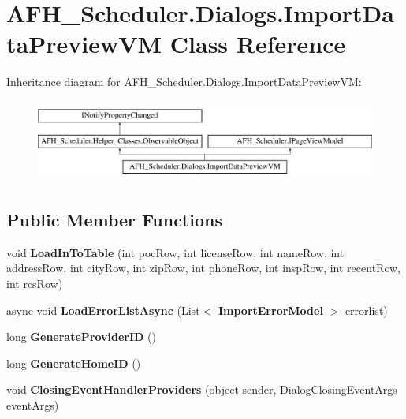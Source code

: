 \section{A\+F\+H\+\_\+\+Scheduler.\+Dialogs.\+Import\+Data\+Preview\+VM Class Reference}
\label{class_a_f_h___scheduler_1_1_dialogs_1_1_import_data_preview_v_m}
Inheritance diagram for A\+F\+H\+\_\+\+Scheduler.\+Dialogs.\+Import\+Data\+Preview\+VM\+:\begin{figure}[H]
\begin{center}
\leavevmode
\includegraphics[height=2.700965cm]{class_a_f_h___scheduler_1_1_dialogs_1_1_import_data_preview_v_m}
\end{center}
\end{figure}
\subsection*{Public Member Functions}
\begin{DoxyCompactItemize}
\item 
\mbox{\label{class_a_f_h___scheduler_1_1_dialogs_1_1_import_data_preview_v_m_ae5ac717aa86bc4ae70e7946ab3d13f30}} 
void {\bfseries Load\+In\+To\+Table} (int poc\+Row, int license\+Row, int name\+Row, int address\+Row, int city\+Row, int zip\+Row, int phone\+Row, int insp\+Row, int recent\+Row, int rcs\+Row)
\item 
\mbox{\label{class_a_f_h___scheduler_1_1_dialogs_1_1_import_data_preview_v_m_abed097746a0a1a740e17135173454c8e}} 
async void {\bfseries Load\+Error\+List\+Async} (List$<$ \textbf{ Import\+Error\+Model} $>$ errorlist)
\item 
\mbox{\label{class_a_f_h___scheduler_1_1_dialogs_1_1_import_data_preview_v_m_afa32d85ad18973754b7cfcaa3a3252d0}} 
long {\bfseries Generate\+Provider\+ID} ()
\item 
\mbox{\label{class_a_f_h___scheduler_1_1_dialogs_1_1_import_data_preview_v_m_a2386fc86c59e96d079c1762fbf38533a}} 
long {\bfseries Generate\+Home\+ID} ()
\item 
\mbox{\label{class_a_f_h___scheduler_1_1_dialogs_1_1_import_data_preview_v_m_aaceea863fbedd3c8ba1f772a21cd13ed}} 
void {\bfseries Closing\+Event\+Handler\+Providers} (object sender, Dialog\+Closing\+Event\+Args event\+Args)
\end{DoxyCompactItemize}
